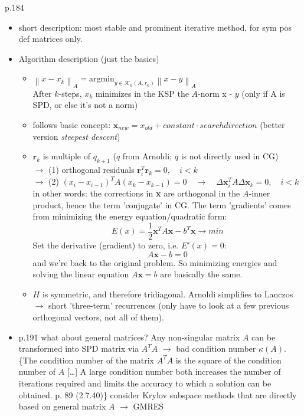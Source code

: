 \documentclass{scrartcl}
\numberwithin{equation}{section}
\newcommand{\norm}[1]{\left\lVert#1\right\rVert}
\begin{document}
\cite{Ascher:2011:FCN:2031413} p.184\\
\begin{itemize}
\item short description: most stable and prominent iterative method, for sym pos def matrices only.
\item Algorithm description (just the basics)
	\begin{itemize}
	\item $\norm{x - x_k}_A = \text{argmin}_{y \in \mathcal{K}_k(A, r_0)}\norm{x - y}_A$\\
	 After $k$-steps, $x_k$ minimizes in the KSP the $A$-norm x - $y$ (only if A is SPD, or else it's not a norm)
	\item follows basic concept: $\textbf{x}_{new} = x_{old} + constant \cdot search direction$ (better version \textit{steepest descent})
	\item $\textbf{r}_k$ is multiple of $q_{k+1}$ ($q$ from Arnoldi; $q$ is not directly used in CG)\\
	$\to$ (1) orthogonal residuals $\textbf{r}_i^T\textbf{r}_k = 0, \quad i < k$\\
	$\to$ (2) $(x_i - x_{i-1})^T A (x_k - x_{k-1}) = 0 \quad \to \quad\Delta \textbf{x}_i^T A \Delta \textbf{x}_k = 0, \quad  i < k$\\
	in other words: the corrections in \textbf{x} are orthogonal in the $A$-inner product, hence the term 'conjugate' in CG. The term 'gradients' comes from minimizing the energy equation/quadratic form:
	\begin{equation*}
	E(x) = \frac{1}{2} \textbf{x}^TA\textbf{x} - b^T\textbf{x} \to min
	\end{equation*}	 
	Set the derivative (gradient) to zero, i.e. $E'(x) = 0$:
	\begin{equation*}
	A\textbf{x} - b = 0
	\end{equation*}
	and we're back to the original problem. So minimizing energies and solving the linear equation $A\textbf{x} = b$ are basically the same.
	\item $H$ is symmetric, and therefore tridiagonal. Arnoldi simplifies to Lanczos $\to$ short 'three-term' recurrences (only have to look at a few previous orthogonal vectors, not all of them).
	\end{itemize}
\item p.191 what about general matrices? Any non-singular matrix $A$ can be transformed into SPD matrix via $A^TA$ $\to$ bad condition number $\kappa (A)$.\\

\{The condition number of the matrix $A^TA$ is the square of the condition number of $A$ [\ldots] A large condition number both increases the number of iterations required and limits the accuracy to which a solution can be obtained. \cite{press92a} p. 89 (2.7.40)\}
consider Krylov subspace methods that are directly based on general matrix $A$ $\to$ GMRES
\end{itemize}
\end{document}

